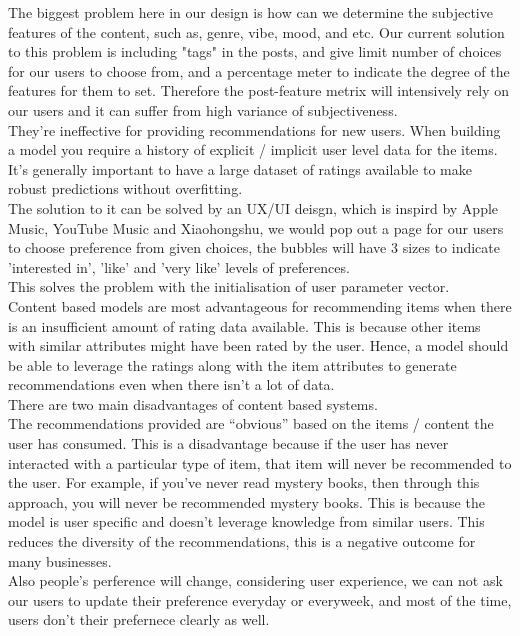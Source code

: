 The biggest problem here in our design is how can we determine the subjective features of the content, such as, genre, vibe, mood, and etc. Our current solution to this problem is including "tags" in the posts, and give limit number of choices for our users to choose from, 
and a percentage meter to indicate the degree of the features for them to set. Therefore the post-feature metrix will intensively rely on our users and it can suffer from high variance of subjectiveness.
\\They’re ineffective for providing recommendations for new users. When building a model you require a history of explicit / implicit user level data for the items. It’s generally important to have a large dataset of ratings available to make robust predictions without overfitting.
\\The solution to it can be solved by an UX/UI deisgn, which is inspird by Apple Music, YouTube Music and Xiaohongshu, we would pop out a page for our users to choose preference from given choices, the bubbles will have 3 sizes to indicate 'interested in', 'like' and 'very like' levels of preferences. 
\\This solves the problem with the initialisation of user parameter vector.
%
\\Content based models are most advantageous for recommending items when there is an insufficient amount of rating data available. This is because other items with similar attributes might have been rated by the user. Hence, a model should be able to leverage the ratings along with the item attributes to generate recommendations even when there isn’t a lot of data.
\\There are two main disadvantages of content based systems.
\\The recommendations provided are “obvious” based on the items / content the user has consumed. This is a disadvantage because if the user has never interacted with a particular type of item, that item will never be recommended to the user. For example, if you’ve never read mystery books, then through this approach, you will never be recommended mystery books. This is because the model is user specific and doesn’t leverage knowledge from similar users. This reduces the diversity of the recommendations, this is a negative outcome for many businesses.
\\Also people's perference will change, considering user experience, we can not ask our users to update their preference everyday or everyweek, 
and most of the time, users don't their prefernece clearly as well.


